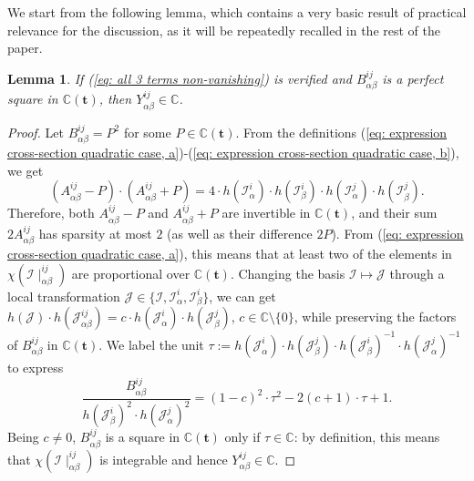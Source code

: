 \documentclass[10pt]{article}
\newtheorem{lem}{Lemma}%
\theoremstyle{remark}%
\theoremstyle{definition}%
\begin{document}
We start from the following lemma, which contains a very basic result of practical relevance for the discussion, as it will be repeatedly recalled in the rest of the paper.  
\begin{lem}
\label{lem: case B^(ij)_(ab) square} If (\ref{eq: all 3 terms non-vanishing}) is verified and $B_{\alpha\beta}^{ij}$ is a perfect square in $\mathbb{C}(\mathbf{t})$, then $Y_{\alpha\beta}^{ij}\in\mathbb{C}$. 
\end{lem}
\begin{proof}
Let $B_{\alpha\beta}^{ij}=P^{2}$ for some $P\in\mathbb{C}(\mathbf{t})$.
From the definitions (\ref{eq: expression cross-section quadratic case, a})-(\ref{eq: expression cross-section quadratic case, b}), we get 
 \begin{equation}
\left(A_{\alpha\beta}^{ij}-P\right)\cdot\left(A_{\alpha\beta}^{ij}+P\right)=4\cdot h(\mathcal{I}_{\alpha}^{i})\cdot h(\mathcal{I}_{\beta}^{i})\cdot h(\mathcal{I}_{\alpha}^{j})\cdot h(\mathcal{I}_{\beta}^{j}).
\label{eq: factorization if B perfect square}
 \end{equation}
Therefore, both $A_{\alpha\beta}^{ij}-P$ and $A_{\alpha\beta}^{ij}+P$ are invertible in $\mathbb{C}(\mathbf{t})$, and  
their sum $2A_{\alpha\beta}^{ij}$ has sparsity at most $2$ (as well as their difference $2P$). From (\ref{eq: expression cross-section quadratic case, a}), this means that at least two of the elements in $\chi(\mathcal{I}\mid_{\alpha\beta}^{ij})$ are proportional over $\mathbb{C}(\mathbf{t})$. Changing the basis $\mathcal{I}\mapsto\mathcal{J}$ through a local transformation $\mathcal{J}\in\{\mathcal{I},\mathcal{I}_{\alpha}^{i},\mathcal{I}_{\beta}^{i}\}$, we can get $h(\mathcal{J})\cdot h(\mathcal{J}_{\alpha\beta}^{ij})=c\cdot h(\mathcal{J}_{\alpha}^{i})\cdot h(\mathcal{J}_{\beta}^{j})$,
$c\in\mathbb{C}\setminus\{0\}$, while preserving the factors of $B_{\alpha\beta}^{ij}$ in $\mathbb{C}(\mathbf{t})$. We label the unit $\tau:=h(\mathcal{J}_{\alpha}^{i})\cdot h(\mathcal{J}_{\beta}^{j})\cdot h(\mathcal{J}_{\beta}^{i})^{-1}\cdot h(\mathcal{J}_{\alpha}^{j})^{-1}$ to express 
 \begin{equation}
\frac{B_{\alpha\beta}^{ij}}{h(\mathcal{J}_{\beta}^{i})^{2}\cdot h(\mathcal{J}_{\alpha}^{j})^{2}}=(1-c)^{2}\cdot\tau^{2}-2(c+1)\cdot\tau+1.
\label{eq: B with two proportional terms}
 \end{equation}
Being $c\neq0$, $B_{\alpha\beta}^{ij}$ is a square in $\mathbb{C}(\mathbf{t})$ only if $\tau\in\mathbb{C}$: by definition, this means that $\chi(\mathcal{I}\mid_{\alpha\beta}^{ij})$ is integrable and hence $Y_{\alpha\beta}^{ij}\in\mathbb{C}$.
\end{proof}
\end{document}
